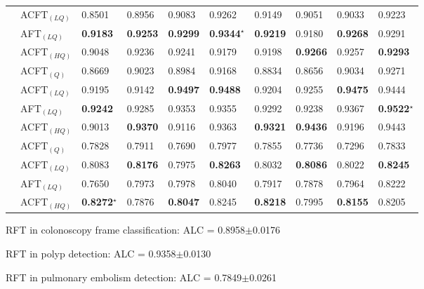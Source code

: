\begin{table}
\begin{center}
\begin{tabular}{p{}p{}|p{}p{}p{}p{}|p{}p{}p{}p{}}
    & ACFT$_{(LQ)}$ & 0.8501 & 0.8956 & 0.9083 & 0.9262 & 0.9149 & 0.9051 & 0.9033 & 0.9223\\
    & AFT$_{(LQ)}$ & \textbf{0.9183} & \textbf{0.9253} & \textbf{0.9299} & \textbf{0.9344}$^\star$ & \textbf{0.9219} & 0.9180 & \textbf{0.9268} & 0.9291\\
    & ACFT$_{(HQ)}$ & 0.9048 & 0.9236 & 0.9241 & 0.9179 & 0.9198 & \textbf{0.9266} & 0.9257 & \textbf{0.9293}\\
    \hline
     & ACFT$_{(Q)}$ & 0.8669 & 0.9023 & 0.8984 & 0.9168 & 0.8834 & 0.8656 & 0.9034 & 0.9271\\
    & ACFT$_{(LQ)}$ & 0.9195 & 0.9142 & \textbf{0.9497} & \textbf{0.9488} & 0.9204 & 0.9255 & \textbf{0.9475} & 0.9444\\
    & AFT$_{(LQ)}$ & \textbf{0.9242} & 0.9285 & 0.9353 & 0.9355 & 0.9292 & 0.9238 & 0.9367 & \textbf{0.9522}$^\star$ \\
    & ACFT$_{(HQ)}$ & 0.9013 & \textbf{0.9370} & 0.9116 & 0.9363 & \textbf{0.9321} & \textbf{0.9436} & 0.9196 & 0.9443\\
    \hline
     & ACFT$_{(Q)}$ & 0.7828 & 0.7911 & 0.7690 & 0.7977 & 0.7855 & 0.7736 & 0.7296 & 0.7833\\
    & ACFT$_{(LQ)}$ & 0.8083 & \textbf{0.8176} & 0.7975 & \textbf{0.8263} & 0.8032 & \textbf{0.8086} & 0.8022 & \textbf{0.8245}\\
    & AFT$_{(LQ)}$ & 0.7650 & 0.7973 & 0.7978 & 0.8040 & 0.7917 & 0.7878 & 0.7964 & 0.8222\\
    & ACFT$_{(HQ)}$ & \textbf{0.8272}$^\star$ & 0.7876 & \textbf{0.8047} & 0.8245 & \textbf{0.8218} & 0.7995 & \textbf{0.8155} & 0.8205\\
    \hline
    \end{tabular}
    \begin{tablenotes}
        \scriptsize
        \item[1] RFT in colonoscopy frame classification: ALC = 0.8958$\pm$0.0176
        \item[2] RFT in polyp detection: ALC = 0.9358$\pm$0.0130
        \item[3] RFT in pulmonary embolism detection: ALC = 0.7849$\pm$0.0261
    \end{tablenotes}
\end{center}
\end{table}


